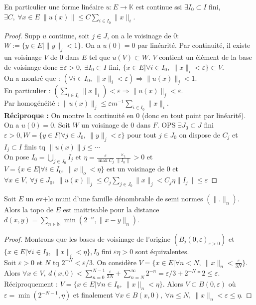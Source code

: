 En particulier une forme linéaire $u:E\to \mathbb{K} $ est continue ssi $\exists I_0\subset I$ fini, $\exists C,\ \forall x\in E\ \|u(x)\|\le C \sum\limits_{i\in I_0}^{} \|x\|_i$.

\begin{proof}
   Supp $u$ continue, soit $j\in J$, on a le voisinage de 0: $W:=\{y\in E|\|y\|_j<1\} $. On a $u(0)=0$ par linéarité. Par continuité, il existe un voisinage $V$ de 0 dans $E$ tel que $u(V)\subset W$. $V$ contient un élément de la base de voisinage donc $\exists \varepsilon >0,\ \exists I_0\subset I$ fini, $\{x\in E|\forall i\in I_0,\ \|x\|_i<\varepsilon  \} \subset V$.\\
   On a montré que : $(\forall i\in I_0,\ \|x\|_i<\varepsilon )\Rightarrow \|u(x)\|_j<1$. \\
   En particulier : $(\sum\limits_{i\in I_0}^{} \|x\|_i)<\varepsilon \Rightarrow \|u(x)\|_j<\varepsilon $.\\
   Par homogénéité : $\|u(x)\|_j\le \varepsilon m^{-1} \sum\limits_{i\in I_0}^{} \|x\|_i$.\\
   \textbf{Réciproque :} On montre la continuité en 0 (donc en tout point par linéarité).\\
   On a $u(0)=0$. Soit $W$ un voisinage de 0 dans $F$. OPS $\exists J_0\subset J$ fini $\varepsilon >0, W=\{y\in F|\forall j\in J_0,\ \|y\|_j<\varepsilon  \} $ pour tout $j\in J_0$ on dispose de $C_j$ et $I_j\subset I$ finis tq $\|u(x)\|j\le \cdots$\\
   On pose $I_0=\bigcup_{j\in J_0}I_j$ et $\eta=\frac{\varepsilon}{\max C_j}\frac{\times_1}{\|I_0\|}>0$ et $V=\{x\in E|\forall i\in I_0,\ \|x\|_o<\eta \}$ est un voisinage de 0 et $\forall x\in V,\ \forall j\in J_0,\ \|u(x)\|_j\le C_j \sum\limits_{j\in J_0}^{} \|x\|_j<C_j\eta\|I_j\|\le \varepsilon $
\end{proof}

\begin{propriete}
    Soit $E$ un ev+lc muni d'une famille dénombrable de semi normes $(\|.\|_n)$. Alors la topo de $E$ est maitrisable pour la distance $d(x,y)=\sum\limits_{n\in \mathbb{N} }^{} \min(2^{-n}, \|x-y\|_n)$.
\end{propriete}
\begin{proof}
    Montrons que les bases de voisinage de l'origine $(B_j(0,\varepsilon )_{\varepsilon >0})$ et $\{x\in E| \forall i\in I_0,\ \|x\|_i<\eta \}, I_0$ fini $\varepsilon \eta>0$ sont équivalentes.\\
    Soit $\varepsilon >0$ et $N$ tq $2^{-N}<\varepsilon /3$. On considère $V=\{x\in E|\forall n<N,\ \|x\|_n<\frac{\varepsilon}{3N} \} $. Alors $\forall x\in V,\ d(x,0)<\sum\limits_{n=0}^{N-1} \frac{\varepsilon}{3N}+\sum\limits_{n=N}^{\infty} 2^{-n}=\varepsilon /3+2^{-N}*2\le \varepsilon $.\\
    Réciproquement : $V=\{x\in E|\forall n\in I_0,\ \|x\|_n<\eta \}$. Alors $V\subset B(0,\varepsilon )$ où $\varepsilon =\min(2^{-N-1},\eta)$ et finalement $\forall x\in B(x,0),\ \forall n\le N,\ \|x\|_n<\varepsilon \le \eta$.

\end{proof}


